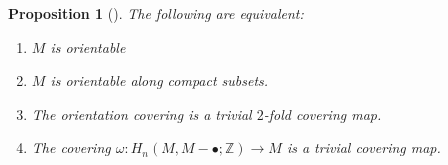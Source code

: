 \documentclass[reqno]{amsart}
\newtheorem{proposition}[theorem]{Proposition}
\theoremstyle{definition}
\theoremstyle{remark}
\begin{document}
\begin{proposition}[]
    The following are equivalent:


    \begin{enumerate}
        \item $M$ is orientable
        \item $M$ is orientable along compact subsets.
        \item The orientation covering is a trivial 
            $2$-fold covering map.
        \item The covering $\omega \colon
            H_n(M, M - \bullet ; \mathbb{Z}) \to M$ is
            a trivial covering map.
    \end{enumerate}

\end{proposition}
\end{document}
